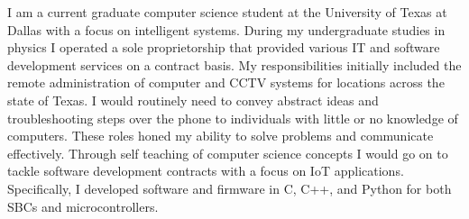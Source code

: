 \begin{cvletter}

	I am a current graduate computer science student at the University
	of Texas at Dallas with a focus on intelligent systems.
	During my undergraduate studies in physics I operated a sole
	proprietorship that provided various IT and software development
	services on a contract basis.
	My responsibilities initially included
	the remote administration of computer and CCTV systems for locations
	across the state of Texas. I would routinely need to convey abstract
	ideas and troubleshooting steps over the phone to individuals with
	little or no knowledge of computers. These roles honed my ability to
	solve problems and communicate effectively.
	Through self teaching of computer science concepts I would go on
	to tackle software development contracts with a focus on IoT
	applications. Specifically, I developed software and firmware in C,
	C++, and Python for both SBCs and microcontrollers.

\end{cvletter}
